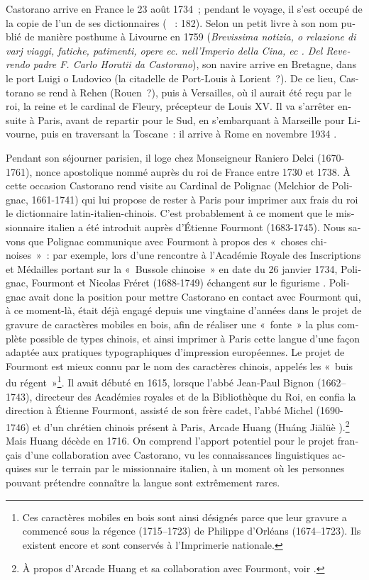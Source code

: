 \documentclass[output=paper,colorlinks,citecolor=brown,arabicfont,chinesefont,booklanguage=french]{langscibook}
\begin{document}
\begin{otherlanguage}{french}
Castorano arrive en France le 23 août 1734~; pendant le voyage, il s’est occupé de la copie de l’un de ses dictionnaires (\citealt{Li2017} ~: 182). Selon un petit livre à son nom publié de manière posthume à Livourne en 1759 (\emph{Brevissima notizia, o relazione di varj viaggi, fatiche, patimenti, opere ec. nell'Imperio della Cina, ec . Del Reverendo padre F. Carlo Horatii da Castorano}), son navire arrive en Bretagne, dans le port Luigi o Ludovico (la citadelle de Port-Louis à Lorient~?). De ce lieu, Castorano se rend à Rehen (Rouen~?), puis à Versailles, où il aurait été reçu par le roi, la reine et le cardinal de Fleury, précepteur de Louis XV. Il va s’arrêter ensuite à Paris, avant de repartir pour le Sud, en s’embarquant à Marseille pour Livourne, puis en traversant la Toscane~: il arrive à Rome en novembre 1934 \citep[60--62]{Orazi1759}.

Pendant son séjourner parisien, il loge chez Monseigneur Raniero Delci (1670-1761), nonce apostolique nommé auprès du roi de France entre 1730 et 1738. À cette occasion Castorano rend visite au Cardinal de Polignac (Melchior de Polignac, 1661-1741) qui lui propose de rester à Paris pour imprimer aux frais du roi le dictionnaire latin-italien-chinois. C’est probablement à ce moment que le missionnaire italien a été introduit auprès d’Étienne Fourmont (1683-1745). Nous savons que Polignac communique avec Fourmont à propos des «~choses chinoises~»~: par exemple, lors d’une rencontre à l'Académie Royale des Inscriptions et Médailles portant sur la «~Bussole chinoise~» en date du 26 janvier 1734, Polignac, Fourmont et Nicolas Fréret (1688-1749) échangent sur le figurisme \citep[56--58, 275--276]{Leung2002}. Polignac avait donc la position pour mettre Castorano en contact avec Fourmont qui, à ce moment-là, était déjà engagé depuis une vingtaine d’années dans le projet de gravure de caractères mobiles en bois, afin de réaliser une «~fonte~» la plus complète possible de types chinois, et ainsi imprimer à Paris cette langue d’une façon adaptée aux pratiques typographiques d’impression européennes. Le projet de Fourmont est mieux connu par le nom des caractères chinois, appelés les «~buis du régent~»\footnote{Ces caractères mobiles en bois sont ainsi désignés parce que leur gravure a commencé sous la régence (1715--1723) de Philippe d’Orléans (1674--1723). Ils existent encore et sont conservés à l’Imprimerie nationale.}. Il avait débuté en 1615, lorsque l’abbé Jean-Paul Bignon (1662--1743), directeur des Académies royales et de la Bibliothèque du Roi, en confia la direction à Étienne Fourmont, assisté de son frère cadet, l’abbé Michel (1690-1746) et d’un chrétien chinois présent à Paris, Arcade Huang (Huáng Jiālüè {}).\footnote{À propos d’Arcade Huang et sa collaboration avec Fourmont, voir \citet{Xu_minglong_2004, Sieber2013}.} Mais Huang décède en 1716. On comprend l’apport potentiel pour le projet français d’une collaboration avec Castorano, vu les connaissances linguistiques acquises sur le terrain par le missionnaire italien, à un moment où les personnes pouvant prétendre connaître la langue sont extrêmement rares.


\end{otherlanguage}
\end{document}
